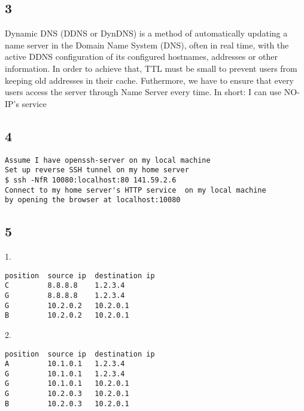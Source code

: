 \documentclass{article}
\begin{document}
    \subsection{3}
    Dynamic DNS (DDNS or DynDNS) is a method of automatically updating a name server in the Domain Name System (DNS), often in real time, with the active DDNS configuration of its configured hostnames, addresses or other information. In order to achieve that, TTL must be small to prevent users from keeping old addresses in their cache. Futhermore, we have to ensure that every users access the server through Name Server every time.
    In short: I can use NO-IP's service
    \subsection{4}
\begin{verbatim}
Assume I have openssh-server on my local machine
Set up reverse SSH tunnel on my home server
$ ssh -NfR 10080:localhost:80 141.59.2.6
Connect to my home server's HTTP service  on my local machine
by opening the browser at localhost:10080
\end{verbatim}
    \subsection{5}
1.
\begin{verbatim}
position  source ip  destination ip
C         8.8.8.8    1.2.3.4
G         8.8.8.8    1.2.3.4
G         10.2.0.2   10.2.0.1
B         10.2.0.2   10.2.0.1
\end{verbatim}
2.
\begin{verbatim}
position  source ip  destination ip
A         10.1.0.1   1.2.3.4
G         10.1.0.1   1.2.3.4
G         10.1.0.1   10.2.0.1
G         10.2.0.3   10.2.0.1
B         10.2.0.3   10.2.0.1
\end{verbatim}
\end{document}
